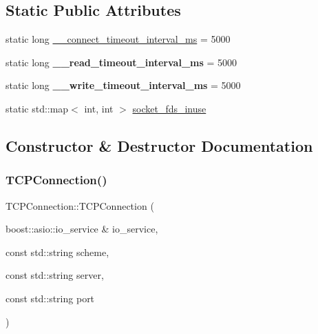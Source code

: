 \subsection*{Static Public Attributes}
\begin{DoxyCompactItemize}
\item 
static long \hyperlink{class_t_c_p_connection_a20685b25079d961a7a9bf1f35b9e80c9}{\+\_\+\+\_\+connect\+\_\+timeout\+\_\+interval\+\_\+ms} = 5000
\item 
\mbox{\label{class_t_c_p_connection_ab556118dc22a172990f22306047eb4f0}} 
static long {\bfseries \+\_\+\+\_\+read\+\_\+timeout\+\_\+interval\+\_\+ms} = 5000
\item 
\mbox{\label{class_t_c_p_connection_adb05ef40de90512600fea00ce229b9ed}} 
static long {\bfseries \+\_\+\+\_\+write\+\_\+timeout\+\_\+interval\+\_\+ms} = 5000
\item 
static std\+::map$<$ int, int $>$ \hyperlink{class_t_c_p_connection_a257b53aea1460ce87ca0d5f269d1326f}{socket\+\_\+fds\+\_\+inuse}
\end{DoxyCompactItemize}


\subsection{Constructor \& Destructor Documentation}
\mbox{\label{class_t_c_p_connection_a1786a9f9ea84d1e504dee290d0425ce8}} 
\subsubsection{\texorpdfstring{T\+C\+P\+Connection()}{TCPConnection()}\hspace{0.1cm}{\footnotesize\ttfamily [1/2]}}
{\footnotesize\ttfamily T\+C\+P\+Connection\+::\+T\+C\+P\+Connection (\begin{DoxyParamCaption}\item[{boost\+::asio\+::io\+\_\+service \&}]{io\+\_\+service,  }\item[{const std\+::string}]{scheme,  }\item[{const std\+::string}]{server,  }\item[{const std\+::string}]{port }\end{DoxyParamCaption})}


